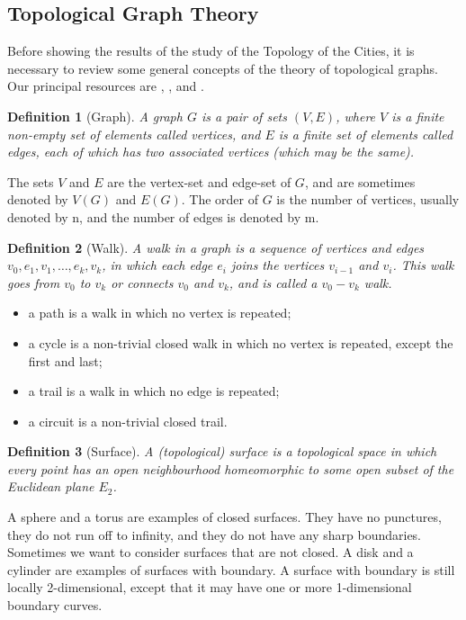 \documentclass[10pt]{article}
\newtheorem{definition}{Definition}
\begin{document}
\subsection{Topological Graph Theory}
Before showing the results of the study of the Topology of the Cities, it is necessary to review some general concepts of the theory of topological graphs. Our principal resources are \cite{gross2009topics}, \cite{bonnington2012foundations}, \cite{gross1987topological} and \cite{richeson2008euler}.\\

\begin{definition}[Graph]
A graph $G$ is a pair of sets $(V , E)$, where $V$ is a finite non-empty set of elements called vertices, and $E$ is a finite set of elements called edges, each of which has two associated vertices (which may be the same).
\end{definition}

The sets $V$ and $E$ are the vertex-set and edge-set of $G$, and are sometimes denoted by $V(G)$ and $E(G)$. The order of $G$ is the number of vertices, usually denoted by n, and the number of edges is denoted by m.

\begin{definition}[Walk]
A walk in a graph is a sequence of vertices and edges $v_0, e_1, v_1, \dots, e_k, v_k$, in which each edge $e_i$ joins the vertices $v_{i-1}$ and $v_i$. This walk goes from $v_0$ to $v_k$ or connects $v_0$ and $v_k$, and is called a $v_0-v_k$ walk.
\end{definition}

\begin{itemize}
    \item a path is a walk in which no vertex is repeated;
    \item a cycle is a non-trivial closed walk in which no vertex is repeated, except the first and last;
    \item a trail is a walk in which no edge is repeated;
    \item a circuit is a non-trivial closed trail.
\end{itemize}

\begin{definition}[Surface]
A (topological) surface is a topological space in which every point has an open neighbourhood homeomorphic to some open subset of the Euclidean plane $E_2$.
\end{definition}

A sphere and a torus are examples of closed surfaces. They have no punctures, they do not run off to infinity, and they do not have any sharp boundaries. Sometimes we want to consider surfaces that are not closed. A disk and a cylinder are examples of surfaces with boundary. A surface with boundary is still locally 2-dimensional, except that it may have one or more 1-dimensional boundary curves.\\
\end{document}

